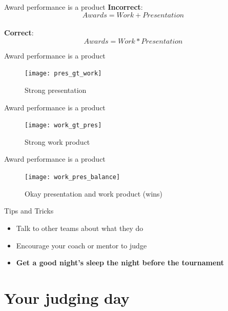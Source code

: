 \documentclass{beamer}
\begin{document}
  \begin{frame}{Award performance is a product}
    \textbf{Incorrect}: \[Awards = Work + Presentation\]
    \\
    \textbf{Correct}: \[Awards = Work * Presentation\]
  \end{frame}

  \begin{frame}{Award performance is a product}
    \begin{center}
      \begin{figure}
        \texttt{[image: pres\_gt\_work]}
        \caption{Strong presentation}
      \end{figure}
    \end{center}
  \end{frame}

  \begin{frame}{Award performance is a product}
    \begin{center}
      \begin{figure}
        \texttt{[image: work\_gt\_pres]}
        \caption{Strong work product}
      \end{figure}
    \end{center}
  \end{frame}

  \begin{frame}{Award performance is a product}
    \begin{center}
      \begin{figure}
        \texttt{[image: work\_pres\_balance]}
        \caption{Okay presentation and work product (wins)}
      \end{figure}
    \end{center}
  \end{frame}

  \begin{frame}{Tips and Tricks}
    \begin{itemize}
      \item Talk to other teams about what they do \pause
      \item Encourage your coach or mentor to judge \pause
      \item \textbf{Get a good night's sleep the night before the tournament}
    \end{itemize}
  \end{frame}

  \section{Your judging day}
\end{document}
